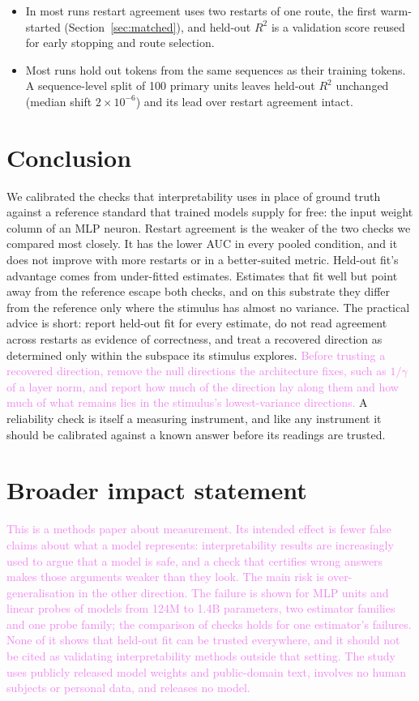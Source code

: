 \documentclass[10pt]{article}
\newcommand{\draft}[1]{\textcolor{violet}{#1}}
\begin{document}
\begin{itemize}
  unidentifiable (Section~\ref{sec:identifiability}). Threshold sweeps and a functional label
  are reported as sensitivity analyses.
  \item In most runs restart agreement uses two restarts of one route, the first warm-started
  (Section~\ref{sec:matched}), and held-out $R^2$ is a validation score reused for early
  stopping and route selection.
  \item Most runs hold out tokens from the same sequences as their training tokens. A
  sequence-level split of 100 primary units leaves held-out $R^2$ unchanged (median shift
  $2\times10^{-6}$) and its lead over restart agreement intact.
\end{itemize}

\section{Conclusion}
We calibrated the checks that interpretability uses in place of ground truth against a
reference standard that trained models supply for free: the input weight column of an MLP
neuron. Restart agreement is the weaker of the two checks we compared most closely. It has the
lower AUC in every pooled condition, and it does not improve with more restarts or in a
better-suited metric. Held-out fit's advantage comes from under-fitted estimates. Estimates
that fit well but point away from the reference escape both checks, and on this substrate
they differ from the reference only where the stimulus has almost no variance. The practical
advice is short: report held-out fit for every estimate, do not read agreement across
restarts as evidence of correctness, and treat a recovered direction as determined only
within the subspace its stimulus explores. \draft{Before trusting a recovered direction, remove the null directions
the architecture fixes, such as $1/\gamma$ of a layer norm, and report how much of the direction
lay along them and how much of what remains lies in the stimulus's lowest-variance
directions.} A reliability check is itself a measuring
instrument, and like any instrument it should be calibrated against a known answer before its
readings are trusted.

\section*{Broader impact statement}
\draft{This is a methods paper about measurement. Its intended effect is fewer false claims about
what a model represents: interpretability results are increasingly used to argue that a model is
safe, and a check that certifies wrong answers makes those arguments weaker than they look. The
main risk is over-generalisation in the other direction. The failure is shown for MLP units and
linear probes of models from 124M to 1.4B parameters, two estimator families and one probe family;
the comparison of checks holds for one estimator's failures. None of it shows that held-out fit can
be trusted everywhere, and it should not be cited as validating interpretability methods outside
that setting. The study uses publicly released model weights and
public-domain text, involves no human subjects or personal data, and releases no model.}
\end{document}
